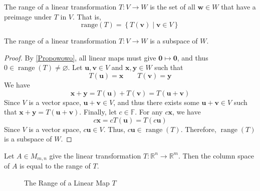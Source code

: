 \begin{definition}[Range]
    The range of a linear transformation \(T:V\to W\) is the set of all \(\mathbf{w}\in W\) that have a preimage under \(T\) in \(V\). That is,
    \[
        \text{range}(T)=\left\{ T(\mathbf{v}) \mid \mathbf{v}\in V \right\} 
    \]
\end{definition}
\begin{theorem}
    The range of a linear transformation \(T:V\to W\) is a subspace of \(W\).
\end{theorem}
\begin{proof}
    By \ref{Propowowo}, all linear maps must give \(\mathbf{0}\mapsto \mathbf{0}\), and thus \(0\in\operatorname{range}(T)\neq \varnothing  \). Let \(\mathbf{u},\mathbf{v}\in V\) and \(\mathbf{x},\mathbf{y}\in W\) such that 
    \[
        T(\mathbf{u})=\mathbf{x}\qquad T(\mathbf{v})=\mathbf{y}
    \]
    We have
    \[
        \mathbf{x}+\mathbf{y}=T(\mathbf{u})+T(\mathbf{v})=T(\mathbf{u}+\mathbf{v})
    \]
    Since \(V\) is a vector space, \(\mathbf{u}+\mathbf{v}\in V\), and thus there exists some \(\mathbf{u}+\mathbf{v}\in V\) such that \(\mathbf{x}+\mathbf{y}=T(\mathbf{u}+\mathbf{v})\). Finally, let \(c\in\mathbb{F}\). For any \(c \mathbf{x}\), we have 
    \[
        c \mathbf{x}=c T(\mathbf{u})=T(c \mathbf{u})
    \]
    Since \(V\) is a vector space, \(c \mathbf{u}\in V\). Thus, \(c \mathbf{u}\in \operatorname{range}(T) \). Therefore, \(\operatorname{range}(T) \) is a subspace of \(W\).
\end{proof}
\begin{corollary}
    Let \(A\in M_{m,n}\) give the linear transformation \(T:\mathbb{R}^n \to \mathbb{R}^m\). Then the column space of \(A\) is equal to the range of \(T\).
\end{corollary}
\begin{center}
\begin{figure}[ht]
    \centering
    \caption{The Range of a Linear Map \(T\)}
\end{figure}
\end{center}